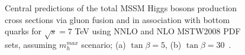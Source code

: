 \begin{figure}[tp]
     \begin{center}

    \end{center}
    \caption{Central predictions of the total MSSM Higgs bosons production cross sections via gluon fusion and in association with
	bottom quarks  for $\sqrt{s} = 7$ TeV using NNLO and NLO MSTW2008 PDF sets, assuming  $m_h^{max}$ scenario; (a) $\tan\beta  = 5$, 
	(b) $\tan\beta  = 30$~\cite{LHCxsec1}.
	 }

   \label{fig:xsec}
\end{figure}


